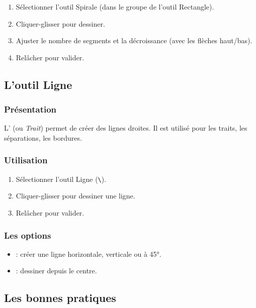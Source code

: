 \begin{enumerate}
    \item Sélectionner l'outil Spirale (dans le groupe de l'outil Rectangle).
    \item Cliquer-glisser pour dessiner.
    \item Ajuster le nombre de segments et la décroissance (avec les flèches haut/bas).
    \item Relâcher pour valider.
\end{enumerate}

\subsection{L'outil Ligne}

\subsubsection{Présentation}

L' (ou \emph{Trait}) permet de créer des lignes droites. Il est utilisé pour les traits, les séparations, les bordures.

\subsubsection{Utilisation}

\begin{enumerate}
    \item Sélectionner l'outil Ligne (\texttt{\textbackslash}).
    \item Cliquer-glisser pour dessiner une ligne.
    \item Relâcher pour valider.
\end{enumerate}

\subsubsection{Les options}

\begin{itemize}
    \item {} : créer une ligne horizontale, verticale ou à 45°.
    \item {} : dessiner depuis le centre.
\end{itemize}

\subsection{Les bonnes pratiques}


